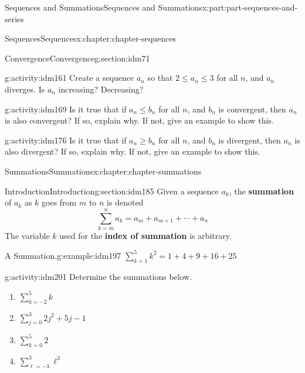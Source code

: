 \documentclass[oneside,10pt,]{book}
\newcommand{\terminology}[1]{\textbf{#1}}
\begin{document}
\begin{partptx}{Sequences and Summations}{}{Sequences and Summations}{}{}{x:part:part-sequences-and-series}
\begin{chapterptx}{Sequences}{}{Sequences}{}{}{x:chapter:chapter-sequences}
\begin{sectionptx}{Convergence}{}{Convergence}{}{}{g:section:idm71}
\begin{activity}{}{g:activity:idm161}
Create a sequence \(a_n\) so that \(2 \leq a_n \leq 3\) for all \(n\), and \(a_n\) diverges. Is \(a_n\) increasing? Decreasing?%
\end{activity}
\begin{activity}{}{g:activity:idm169}%
Is it true that if \(a_n \leq b_n\) for all \(n\), and \(b_n\) is convergent, then \(a_n\) is also convergent? If so, explain why. If not, give an example to show this.%
\end{activity}
\begin{activity}{}{g:activity:idm176}%
Is it true that if \(a_n \geq b_n\) for all \(n\), and \(b_n\) is divergent, then \(a_n\) is also divergent? If so, explain why. If not, give an example to show this.%
\end{activity}
\end{sectionptx}
\end{chapterptx}
%
\typeout{************************************************}
\typeout{************************************************}
%
\begin{chapterptx}{Summations}{}{Summations}{}{}{x:chapter:chapter-summations}
%
%
\typeout{************************************************}
\typeout{************************************************}
%
\begin{sectionptx}{Introduction}{}{Introduction}{}{}{g:section:idm185}
Given a sequence \(a_k\), the \terminology{summation} of \(a_k\) as \(k\) goes from \(m\) to \(n\) is denoted%
\begin{equation*}
\sum_{k=m}^n a_k = a_m + a_{m+1} + \cdots + a_n
\end{equation*}
The variable \(k\) used for the \terminology{index of summation} is arbitrary.%
\begin{example}{A Summation.}{g:example:idm197}%
\(\displaystyle\sum_{k = 1}^5 k^2 = 1 + 4 + 9 + 16 + 25\)%
\end{example}
\begin{activity}{}{g:activity:idm201}%
Determine the summations below.%
\begin{enumerate}[font=\bfseries,label=(\alph*),ref=\alph*]
\item{}\(\displaystyle\sum_{k = -2}^5 k\)\item{}\(\displaystyle\sum_{j = 0}^3 2j^2+5j-1\)\item{}\(\displaystyle\sum_{k = 0}^5 2\)\item{}\(\displaystyle\sum_{\ell = -3}^3 \ell^3\)\end{enumerate}

\end{activity}
\end{sectionptx}
\end{chapterptx}
\end{partptx}
\end{document}
